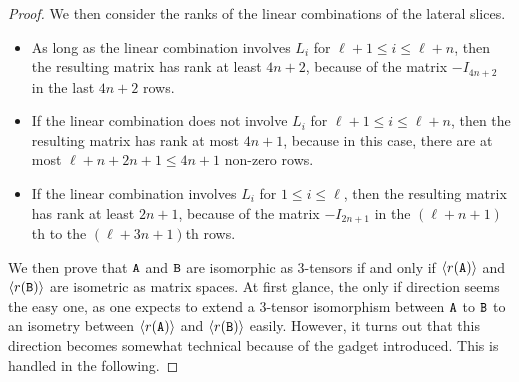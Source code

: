 \documentclass[11pt]{article}
\begin{document}
\begin{proof}
We then consider the ranks of the linear combinations of the lateral slices.
\begin{itemize}
\item As long as the linear combination involves $L_i$ for $\ell+1\leq i\leq 
\ell+n$, then the resulting matrix has rank at least $4n+2$, because of the matrix 
$-I_{4n+2}$ in the last $4n+2$ rows. 
\item If the linear combination does not involve $L_i$ for $\ell+1\leq i\leq 
\ell+n$, then the resulting matrix has rank at most $4n+1$, because in this case, 
there are at most $\ell+n+2n+1\leq 4n+1$ non-zero rows. 
\item If the linear combination involves $L_i$ for $1\leq i\leq \ell$, then the 
resulting matrix has rank at least $2n+1$, because of the matrix $-I_{2n+1}$ in 
the $(\ell+n+1)$th to the $(\ell+3n+1)$th rows. 
\end{itemize}

We then prove that $\mathtt{A}$ and $\mathtt{B}$ are isomorphic as 3-tensors if and only if 
$\langle r(\mathtt{A}) \rangle$ and $\langle r(\mathtt{B}) \rangle$ 
are isometric as matrix 
spaces. At first glance, the only if direction seems the easy one, as one expects to 
extend a 3-tensor isomorphism between $\mathtt{A}$ to $\mathtt{B}$ to an isometry between 
$\langle r(\mathtt{A}) \rangle$ and $\langle r(\mathtt{B}) \rangle$ easily. However, it turns out that this direction 
becomes somewhat technical because of the gadget introduced. This is handled in the following.


\end{proof}
\end{document}
